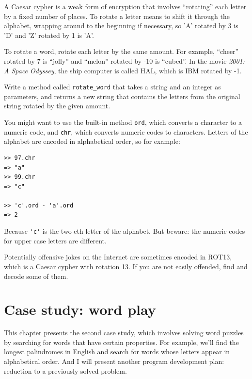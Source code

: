 \documentclass[10pt]{book}
\begin{document}
\begin{exercise}

\label{exrotate}
A Caesar cypher is a weak form of encryption that involves ``rotating'' each
letter by a fixed number of places.  To rotate a letter means
to shift it through the alphabet, wrapping around to the beginning if
necessary, so 'A' rotated by 3 is 'D' and 'Z' rotated by 1 is 'A'.

To rotate a word, rotate each letter by the same amount.
For example, ``cheer'' rotated by 7 is ``jolly'' and ``melon'' rotated
by -10 is ``cubed''.  In the movie {\em 2001: A Space Odyssey}, the 
ship computer is called HAL, which is IBM rotated by -1.


Write a method called \verb"rotate_word"
that takes a string and an integer as parameters, and returns
a new string that contains the letters from the original string
rotated by the given amount.  

You might want to use the built-in method {\tt ord}, which converts
a character to a numeric code, and {\tt chr}, which converts numeric
codes to characters.  Letters of the alphabet are encoded in alphabetical
order, so for example:

\begin{verbatim}
>> 97.chr
=> "a"
>> 99.chr
=> "c"

>> 'c'.ord - 'a'.ord
=> 2
\end{verbatim}

Because \verb"'c'" is the two-eth letter of the alphabet.  But
beware: the numeric codes for upper case letters are different.

Potentially offensive jokes on the Internet are sometimes encoded in
ROT13, which is a Caesar cypher with rotation 13.  If you are not
easily offended, find and decode some of them.

\end{exercise}


\chapter{Case study: word play}
\label{wordplay}

This chapter presents the second case study, which involves
solving word puzzles by searching for words that have certain
properties.  For example, we'll find the longest palindromes
in English and search for words whose letters appear in
alphabetical order.  And I will present another program development
plan: reduction to a previously solved problem.
\end{document}
